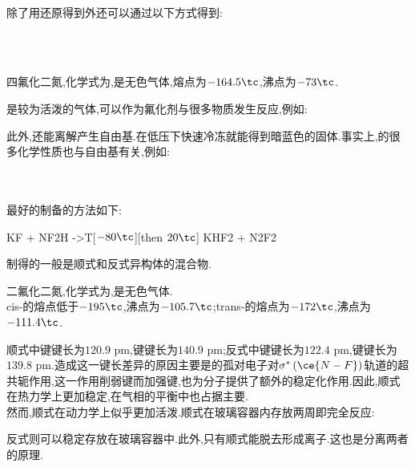 \documentclass{ctexart}
\begin{document}
\paragraph{}
除了用还原得到外还可以通过以下方式得到:
\begin{center}
    \\
    \\
\end{center}
\begin{substance}[\ce{N2F4}]
    四氟化二氮,化学式为,是无色气体,熔点为$-164.5\tc$,沸点为$-73\tc$.
\end{substance}
\indent{}是较为活泼的气体,可以作为氟化剂与很多物质发生反应,例如:
\begin{center}
\end{center}
此外,还能离解产生自由基.在低压下快速冷冻就能得到暗蓝色的固体.事实上,的很多化学性质也与自由基有关,例如:
\begin{center}
    \\
\end{center}
\paragraph{}最好的制备的方法如下:
\begin{center}
    KF + NF2H ->T[$-80\tc$][then $20\tc$] KHF2 + N2F2
\end{center}
制得的一般是顺式和反式异构体的混合物.
\begin{substance}[\ce{N2F2}]
    二氟化二氮,化学式为,是无色气体.\\
    cis-的熔点低于$-195\tc$,沸点为$-105.7\tc$;trans-的熔点为$-172\tc$,沸点为$-111.4\tc$.
\end{substance}
\indent 顺式中键键长为$120.9\text{ pm}$,键键长为$140.9\text{ pm}$;反式中键键长为$122.4\text{ pm}$,键键长为$139.8\text{ pm}$.造成这一键长差异的原因主要是的孤对电子对$\sigma^\ast\left(\ce{N-F}\right)$轨道的超共轭作用,这一作用削弱键而加强键,也为分子提供了额外的稳定化作用.因此,顺式在热力学上更加稳定,在气相的平衡中也占据主要.\\
\indent 然而,顺式在动力学上似乎更加活泼.顺式在玻璃容器内存放两周即完全反应:
\begin{center}
\end{center}
反式则可以稳定存放在玻璃容器中.此外,只有顺式能脱去形成离子.这也是分离两者的原理.
\end{document}
